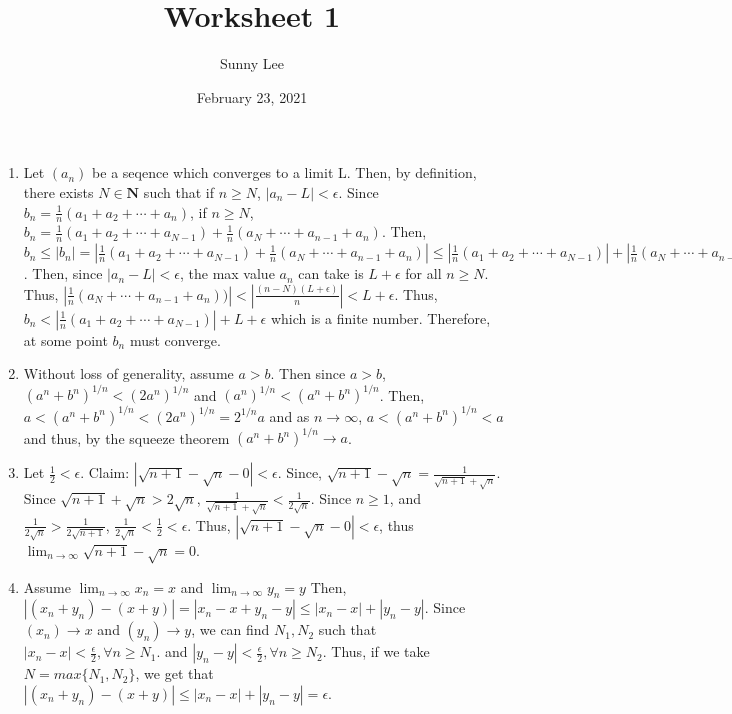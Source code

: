 \documentclass{article}
\title{Worksheet 1}
\author{Sunny Lee}
\date{February 23, 2021}
\newcommand{\NN}{\mathbf N}
\begin{document}
\begin{enumerate}
    \item Let $(a_n)$ be a seqence which converges to a limit L. Then, by definition, 
    there exists $N \in \NN$ such that if $n\geq N$, $|a_n - L| < \epsilon$. Since 
    $b_n = \frac{1}{n}(a_1 + a_2 + \cdots + a_n)$, if $n\geq N$, $b_n = \frac{1}{n}
    (a_1 + a_2 + \cdots + a_{N-1}) + \frac{1}{n}(a_{N} + \cdots + a_{n-1} + a_{n})$.
    Then, $b_n \leq |b_n| = |\frac{1}{n}
    (a_1 + a_2 + \cdots + a_{N-1}) + \frac{1}{n}(a_{N} + \cdots + a_{n-1} + a_{n})|
    \leq |\frac{1}{n}
    (a_1 + a_2 + \cdots + a_{N-1})| + |\frac{1}{n}(a_{N} + \cdots + a_{n-1} + a_{n}))|$. 
    Then, since $|a_n - L| < \epsilon$, the max value $a_n$ can take is $L+\epsilon$ 
    for all $n \geq N$. Thus, $|\frac{1}{n}(a_{N} + \cdots + a_{n-1} + a_{n}))| < 
    |\frac{(n-N)(L+\epsilon)}{n}| < L+\epsilon$. Thus, $b_n < |\frac{1}{n}
    (a_1 + a_2 + \cdots + a_{N-1})| + L + \epsilon$ which is a finite number. Therefore, 
    at some point $b_n$ must converge. 

    \item Without loss of generality, assume $a > b$. Then since $a > b$, $(a^n + b^n)^{1/n}
    < (2a^n)^{1/n}$ and $(a^n)^{1/n} < (a^n + b^n)^{1/n}$. Then, $a < (a^n + b^n)^{1/n}
    < (2a^n)^{1/n} = 2^{1/n}a$ and as $n\rightarrow \infty$, $a < (a^n + b^n)^{1/n}
    < a$ and thus, by the squeeze theorem $(a^n + b^n)^{1/n} \rightarrow a$. 

    \item Let $\frac{1}{2} < \epsilon$. Claim: $|\sqrt{n+1} - \sqrt{n} - 0| < \epsilon$.
    Since, $\sqrt{n+1} - \sqrt{n} = \frac{1}{\sqrt{n+1}+\sqrt{n}}$.  
    Since $\sqrt{n+1}+\sqrt{n} > 2\sqrt{n}$, $\frac{1}{\sqrt{n+1}+\sqrt{n}} 
    < \frac{1}{2\sqrt{n}}$. Since $n\geq 1$, and $\frac{1}{2\sqrt{n}} > \frac{1}{2\sqrt{n+1}}$, 
    $\frac{1}{2\sqrt{n}} < \frac{1}{2} < \epsilon$. Thus, $|\sqrt{n+1} - \sqrt{n} - 0| < \epsilon$, 
    thus $\lim_{n\rightarrow \infty} \sqrt{n+1} - \sqrt{n} = 0$. 

    \item Assume $\lim_{n\rightarrow \infty} x_n = x $ and $ \lim_{n\rightarrow \infty} y_n = y$ 
    Then, $|(x_n + y_n) - (x + y)| = |x_n - x + y_n - y| \leq |x_n - x| + |y_n - y|$. Since
    $(x_n)\rightarrow x$ and $(y_n)\rightarrow y$, we can find $N_1, N_2$ such that
    $|x_n - x| <\frac{\epsilon}{2}, \forall n\geq N_1$. and 
    $|y_n - y| <\frac{\epsilon}{2}, \forall n\geq N_2$. Thus, if we take $N = max\{N_1, N_2\}$, 
    we get that $|(x_n + y_n) - (x + y)| \leq |x_n - x| + |y_n - y| = \epsilon$. 


\end{enumerate}
\end{document}
